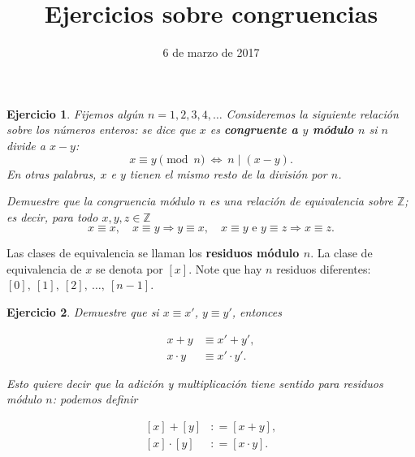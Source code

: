 \documentclass{article}
\author{}
\title{Ejercicios sobre congruencias}
\date{6 de marzo de 2017}
\newcommand{\dfn}{\mathrel{\mathop:}=}
\newcommand{\ZZ}{\mathbb{Z}}
\newcommand{\term}{\textbf}
\theoremstyle{plain}
\newtheorem{ejerc}{Ejercicio}
\newif\ifsol
\begin{document}
\maketitle

\begin{ejerc}
Fijemos algún $n = 1,2,3,4,\ldots$ Consideremos la siguiente relación sobre los números enteros: se dice que $x$ es \term{congruente a $y$ módulo $n$} si $n$ divide a $x-y$:
$$x \equiv y \pmod{n} ~\Leftrightarrow~ n \mid (x-y).$$
En otras palabras, $x$ e $y$ tienen el mismo resto de la división por $n$.

Demuestre que la congruencia módulo $n$ es una relación de equivalencia sobre $\ZZ$; es decir, para todo $x,y,z\in \ZZ$
$$x\equiv x, \quad x\equiv y \Rightarrow y\equiv x, \quad x\equiv y \text{ e } y\equiv z \Rightarrow x\equiv z.$$
\end{ejerc}

\ifsol\begin{proof}[Solución (Martha)]
Obviamente, $n \mid x-x = 0$ para todo $x$. Luego, $n \mid (x-y)$ si y solamente si $n \mid (y-x)$. Por fin, si $n \mid (x-y)$ y $n\mid (y-z)$, entonces
$$n \mid (x-y) + (y-z) = x-z.$$
\end{proof}\fi

Las clases de equivalencia se llaman los \term{residuos módulo $n$}. La clase de equivalencia de $x$ se denota por $[x]$. Note que hay $n$ residuos diferentes: $[0], ~ [1], ~ [2], ~ \ldots, ~ [n-1]$.

\begin{ejerc}
Demuestre que si $x \equiv x'$, $y \equiv y'$, entonces

\begin{align*}
x+y & \equiv x'+y',\\
x\cdot y & \equiv x'\cdot y'.
\end{align*}

Esto quiere decir que la adición y multiplicación tiene sentido para residuos módulo $n$: podemos definir

\begin{align}
\label{suma-de-residuos} [x] + [y] & \dfn [x+y],\\
\label{producto-de-residuos} [x]\cdot [y] & \dfn [x\cdot y].
\end{align}
\end{ejerc}

\ifsol\begin{proof}[Solución (Javier)]
Si $n \mid x-x'$ y $n \mid y-y'$, entonces
$$n \mid (x-x') + (y-y') = (x+y) - (x'-y'),$$
y también
$$n \mid (x-x')\,y + x'\,(y-y') = xy - x'y'.$$

Para ver que las definiciones \eqref{suma-de-residuos} y \eqref{producto-de-residuos} tienen sentido (no dependen de los representantes particulares de las clases de equivalencia), tenemos que verificar que si $[x] = [x']$ y $[y] = [y']$, entonces

\begin{align*}
[x + y] & = [x' + y'],\\
[x\cdot y] & = [x'\cdot y'].
\end{align*}

\noindent Es lo que acabamos de demostrar.
\end{proof}\fi
\end{document}
